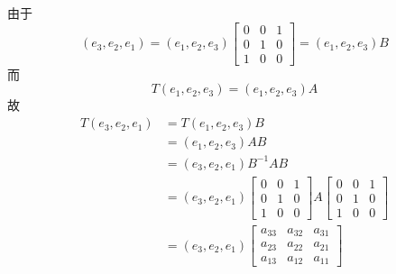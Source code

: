 \documentclass{article}
\begin{document}
\section{}
由于
\begin{equation}
	(e_3,e_2,e_1)=(e_1,e_2,e_3)\begin{bmatrix} 0 & 0 & 1 \\ 0 & 1 & 0\\ 1 & 0 & 0 \end{bmatrix}=(e_1,e_2,e_3)B
\end{equation}
而
\begin{equation}
	T(e_1,e_2,e_3)=(e_1,e_2,e_3)A
\end{equation}
故
\begin{equation}
	\begin{aligned}
	T(e_3,e_2,e_1)&=T(e_1,e_2,e_3)B\\
	&=(e_1,e_2,e_3)AB\\
	&=(e_3,e_2,e_1)B^{-1}AB\\
	&=(e_3,e_2,e_1)\begin{bmatrix} 0 & 0 & 1 \\ 0 & 1 & 0\\ 1 & 0 & 0 \end{bmatrix}A\begin{bmatrix} 0 & 0 & 1 \\ 0 & 1 & 0\\ 1 & 0 & 0 \end{bmatrix}\\
	&=(e_3,e_2,e_1)\begin{bmatrix} a_{33} & a_{32} & a_{31} \\ a_{23} & a_{22} & a_{21}\\ a_{13} & a_{12} & a_{11} \end{bmatrix}
	\end{aligned}
\end{equation}
\end{document}
